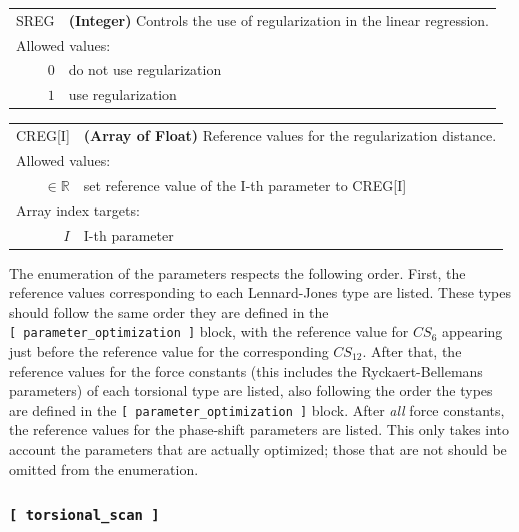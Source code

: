 \documentclass[10pt,a4paper,openany]{memoir}
\numberwithin{equation}{section}
\begin{document}
{
\begin{tabular}{r@{ : }l}
\label{descr:sreg}
     SREG&\textbf{(Integer)} Controls the use of regularization in the linear regression.                                                             \\ 
\multicolumn{2}{l}{Allowed values:} \\ 
    \(0\)& do not use regularization \\ 
    \(1\)& use regularization \\
\end{tabular}
\vspace{1ex}
}
{

\begin{tabular}{r@{ : }l}
\label{descr:creg}
     CREG[I]&\textbf{(Array of Float)} Reference values for the regularization distance.        \\ 
\multicolumn{2}{l}{Allowed values:} \\ 
    \( \in \mathbb{R} \)& set reference value of the I-th parameter to CREG[I]\\ 
\multicolumn{2}{l}{Array index targets:} \\ 
    \( I \)& I-th parameter\\ 
\end{tabular}


The enumeration of the parameters respects the following order.
%
First, the reference values corresponding to each Lennard-Jones type
are listed.
%
These types should follow the same order they are defined in the
\texttt{[~parameter\_optimization~]} block, with the reference value
for $CS_6$ appearing just before the reference value for the
corresponding $CS_{12}$.
%
After that, the reference values for the force constants (this
includes the Ryckaert-Bellemans parameters) of each torsional type are
listed, also following the order the types are defined in the
\texttt{[~parameter\_optimization~]} block.
%
After \textit{all} force constants, the reference values for the
phase-shift parameters are listed.
%
This only takes into account the parameters that are actually
optimized; those that are not should be omitted from the enumeration.

\vspace{1ex}
}

\subsubsection{\texttt{[~torsional\_scan~]}}
\label{sec:inp-torsional_scan}
\end{document}
